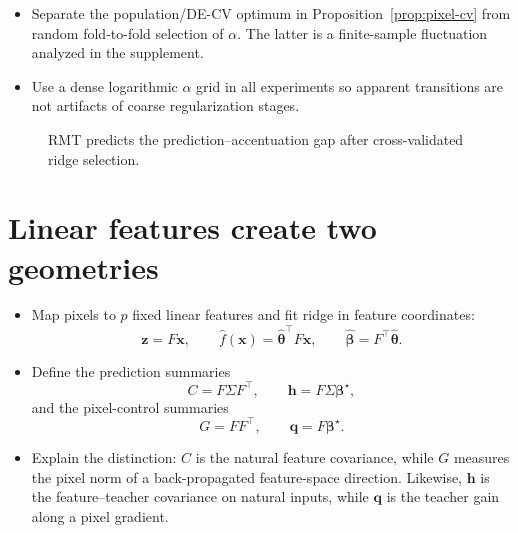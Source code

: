 \documentclass[11pt]{article}
\newcommand{\bhat}{\widehat{\bm\beta}}
\newcommand{\bstar}{\bm\beta^{\star}}
\newcommand{\that}{\widehat{\bm\theta}}
\begin{document}
\begin{itemize}
  \item Separate the population/DE-CV optimum in
        Proposition~\ref{prop:pixel-cv} from random fold-to-fold selection of
        $\alpha$. The latter is a finite-sample fluctuation analyzed in the
        supplement.
  \item Use a dense logarithmic $\alpha$ grid in all experiments so apparent
        transitions are not artifacts of coarse regularization stages.
\end{itemize}

\begin{figure}[t]
  \centering
  \caption{RMT predicts the prediction--accentuation gap after
  cross-validated ridge selection.}
  \label{fig:pixel-rmt}
\end{figure}

\section{Linear features create two geometries}
\label{sec:feature-geometry}

\begin{itemize}
  \item Map pixels to $p$ fixed linear features and fit ridge in feature
        coordinates:
  \begin{equation}
    \bm z=F\bm x,\qquad
    \widehat f(\bm x)=\that^{\top}F\bm x,
    \qquad \bhat=F^{\top}\that.
    \label{eq:feature-model}
  \end{equation}
  \item Define the prediction summaries
  \begin{equation}
    C=F\Sigma F^{\top},
    \qquad \bm h=F\Sigma\bstar,
  \end{equation}
  and the pixel-control summaries
  \begin{equation}
    G=FF^{\top},
    \qquad \bm q=F\bstar.
  \end{equation}
  \item Explain the distinction: $C$ is the natural feature covariance,
        while $G$ measures the pixel norm of a back-propagated feature-space
        direction. Likewise, $\bm h$ is the feature--teacher covariance on
        natural inputs, while $\bm q$ is the teacher gain along a pixel
        gradient.
\end{itemize}
\end{document}
